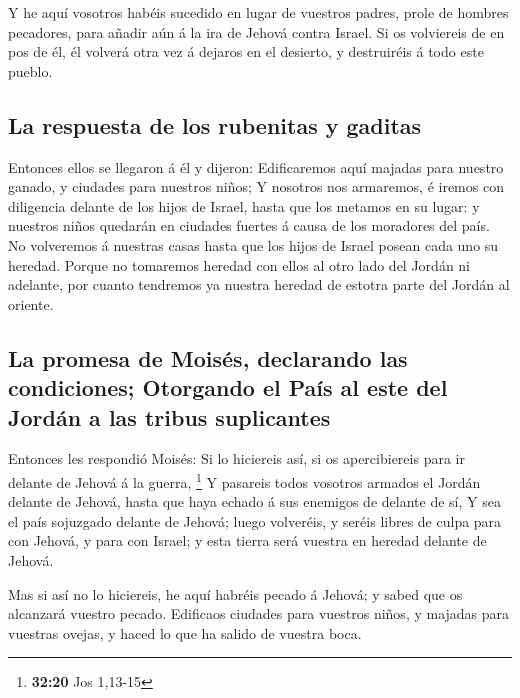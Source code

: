  Y he aquí vosotros habéis sucedido en lugar de vuestros
padres, prole de hombres pecadores, para añadir aún á la ira de Jehová
contra Israel.  Si os volviereis de en pos de él, él
volverá otra vez á dejaros en el desierto, y destruiréis á todo este
pueblo.

\hypertarget{la-respuesta-de-los-rubenitas-y-gaditas}{%
\subsection{La respuesta de los rubenitas y
gaditas}\label{la-respuesta-de-los-rubenitas-y-gaditas}}

 Entonces ellos se llegaron á él y dijeron: Edificaremos
aquí majadas para nuestro ganado, y ciudades para nuestros niños;
 Y nosotros nos armaremos, é iremos con diligencia delante
de los hijos de Israel, hasta que los metamos en su lugar: y nuestros
niños quedarán en ciudades fuertes á causa de los moradores del país.
 No volveremos á nuestras casas hasta que los hijos de
Israel posean cada uno su heredad.  Porque no tomaremos
heredad con ellos al otro lado del Jordán ni adelante, por cuanto
tendremos ya nuestra heredad de estotra parte del Jordán al oriente.

\hypertarget{la-promesa-de-moisuxe9s-declarando-las-condiciones-otorgando-el-pauxeds-al-este-del-jorduxe1n-a-las-tribus-suplicantes}{%
\subsection{La promesa de Moisés, declarando las condiciones; Otorgando
el País al este del Jordán a las tribus
suplicantes}\label{la-promesa-de-moisuxe9s-declarando-las-condiciones-otorgando-el-pauxeds-al-este-del-jorduxe1n-a-las-tribus-suplicantes}}

 Entonces les respondió Moisés: Si lo hiciereis así, si os
apercibiereis para ir delante de Jehová á la guerra, \footnote{\textbf{32:20}
  Jos 1,13-15}  Y pasareis todos vosotros armados el Jordán
delante de Jehová, hasta que haya echado á sus enemigos de delante de
sí,  Y sea el país sojuzgado delante de Jehová; luego
volveréis, y seréis libres de culpa para con Jehová, y para con Israel;
y esta tierra será vuestra en heredad delante de Jehová.

 Mas si así no lo hiciereis, he aquí habréis pecado á
Jehová; y sabed que os alcanzará vuestro pecado.  Edificaos
ciudades para vuestros niños, y majadas para vuestras ovejas, y haced lo
que ha salido de vuestra boca.


